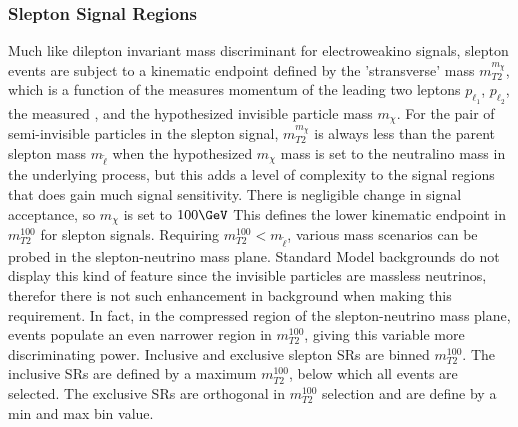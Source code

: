 \subsubsection{Slepton Signal Regions}
\label{sec:sr:mt2}
\iffalse
Figure~\ref{fig:METoverHTmt2} shows the $\met/H_{T}^{lep}$ distribution for slepton samples after applying all the signal region cuts except $\met/H_{T}^{lep}$ and $m_{T2}$.
 \begin{figure}[tbp]
  \centering
  \texttt{[image: /Users/sheenaschier/Documents/LaFiles/figures/thesis/signal\_regions/fig\_03b.pdf]}
 \caption{Distributions of $\met/H_{T}^{lep}$ for the slepton selections, after applying all signal region cuts except those on the $\met/H_{T}^{lep}$ and $m_{T2}$.  The red solid line indicates the cut applied in the signal region; events in the region below the red line are rejected. \textcolor{red}{Change to updated plot.}}
 \label{fig:METoverHTmt2}
 \end{figure}
 \fi
Much like dilepton invariant mass discriminant for electroweakino signals, slepton events are subject to a kinematic endpoint defined by the 'stransverse' mass $m^{m_\chi}_{T2}$, which is a function of the measures momentum of the leading two leptons $p_{\ell_1}$, $p_{\ell_2}$, the measured \pt, and the hypothesized invisible particle mass $m_\chi$.  For the pair of semi-invisible particles in the slepton signal, $m^{m_\chi}_{T2}$ is always less than the parent slepton mass $m_{\tilde\ell}$ when the hypothesized $m_\chi$ mass is set to the neutralino mass in the underlying process, but this adds a level of complexity to the signal regions that does gain much signal sensitivity.  There is negligible change in signal acceptance, so $m_\chi$ is set to $100\GeV$  This defines the lower kinematic endpoint in $m^{100}_{T2}$ for slepton signals.  Requiring $m^{100}_{T2} < m_{\tilde\ell}$, various mass scenarios can be probed in the slepton-neutrino mass plane.  Standard Model backgrounds do not display this kind of feature since the invisible particles are massless neutrinos, therefor there is not such enhancement in background when making this requirement.  In fact, in the compressed region of the slepton-neutrino mass plane, events populate an even narrower region in $m^{100}_{T2}$, giving this variable more discriminating power.  Inclusive and exclusive slepton SRs are binned $m^{100}_{T2}$.  The inclusive SRs are defined by a maximum $m^{100}_{T2}$, below which all events are selected.  The exclusive SRs are orthogonal in $m^{100}_{T2}$ selection and are define by a min and max bin value.

